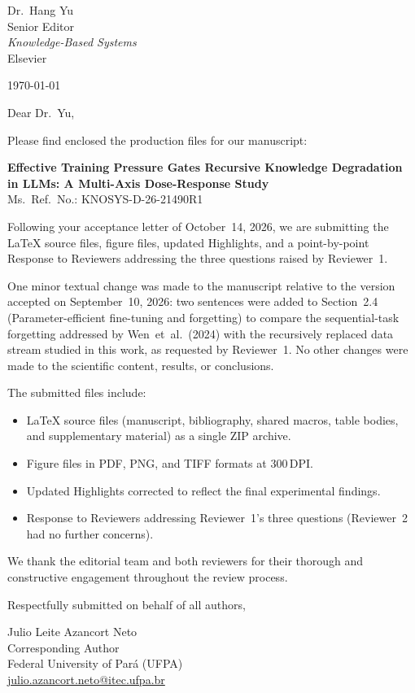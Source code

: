 \documentclass[11pt,a4paper]{article}
\begin{document}
\pagestyle{empty}

\noindent
Dr.\ Hang Yu\\
Senior Editor\\
\textit{Knowledge-Based Systems}\\
Elsevier

\bigskip
\noindent
\today

\bigskip
\noindent
Dear Dr.\ Yu,

Please find enclosed the production files for our manuscript:

\medskip
\noindent
\textbf{Effective Training Pressure Gates Recursive Knowledge Degradation
in LLMs: A Multi-Axis Dose-Response Study}\\
Ms.\ Ref.\ No.: KNOSYS-D-26-21490R1

\medskip
Following your acceptance letter of October~14, 2026, we are submitting
the LaTeX source files, figure files, updated Highlights, and a point-by-point
Response to Reviewers addressing the three questions raised by Reviewer~1.

One minor textual change was made to the manuscript relative to the version
accepted on September~10, 2026: two sentences were added to Section~2.4
(Parameter-efficient fine-tuning and forgetting) to compare the sequential-task
forgetting addressed by \mbox{Wen et al.\ (2024)} with the recursively replaced
data stream studied in this work, as requested by Reviewer~1.
No other changes were made to the scientific content, results, or conclusions.

The submitted files include:
\begin{itemize}
  \item LaTeX source files (manuscript, bibliography, shared macros,
        table bodies, and supplementary material) as a single ZIP archive.
  \item Figure files in PDF, PNG, and TIFF formats at 300\,DPI.
  \item Updated Highlights corrected to reflect the final experimental findings.
  \item Response to Reviewers addressing Reviewer~1's three questions
        (Reviewer~2 had no further concerns).
\end{itemize}

We thank the editorial team and both reviewers for their thorough and
constructive engagement throughout the review process.

\bigskip
\noindent
Respectfully submitted on behalf of all authors,

\bigskip\bigskip
\noindent
Julio Leite Azancort Neto\\
Corresponding Author\\
Federal University of Pará (UFPA)\\
\href{mailto:julio.azancort.neto@itec.ufpa.br}{julio.azancort.neto@itec.ufpa.br}
\end{document}
